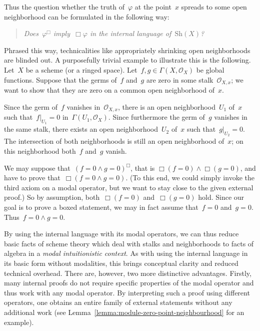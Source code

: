 \documentclass[10pt,reqno,a4paper]{amsbook}
\makeatletter
\theoremstyle{definition}
\theoremstyle{plain}
\theoremstyle{remark}
\renewcommand{\O}{\mathcal{O}}
\newcommand{\Sh}{\mathrm{Sh}}
\newcommand{\?}{\,{:}\,}
\renewcommand{\_}{\mathpunct{.}\,}
\renewenvironment{proof}[1][\proofname]{\par
  \pushQED{\qed}%
  \normalfont \topsep6\p@\@plus6\p@\relax
  \trivlist
  \item[\hskip\labelsep
        \itshape
    #1\@addpunct{.}]\ignorespaces
}{%
  \popQED\endtrivlist\@endpefalse
}
\makeatother
\begin{document}
Thus the question whether the truth of~$\varphi$ at the point~$x$ spreads to
some open neighborhood can be formulated in the following way:
\begin{quote}
\emph{Does~$\varphi^\Box$ imply~$\Box\varphi$ in the internal language
of~$\Sh(X)$?}
\end{quote}
Phrased this way, technicalities like appropriately shrinking open
neighborhoods are blinded out. A purposefully trivial example to illustrate
this is the following. Let~$X$ be a scheme (or a ringed space). Let~$f,g \in
\Gamma(X,\O_X)$ be global functions. Suppose that the germs of~$f$ and~$g$ are
zero in some stalk~$\O_{X,x}$; we want to show that they are zero on a common
open neighborhood of~$x$.

\begin{proof}[Usual proof]Since the germ of~$f$ vanishes in~$\O_{X,x}$, there
is an open neighborhood~$U_1$ of~$x$ such that~$f|_{U_1} = 0$
in~$\Gamma(U_1,\O_X)$. Since furthermore the germ of~$g$ vanishes in the same stalk,
there exists an open neighborhood~$U_2$ of~$x$ such that~$g|_{U_2} = 0$. The
intersection of both neighborhoods is still an open neighborhood of~$x$; on
this neighborhood both~$f$ and~$g$ vanish.
\end{proof}

\begin{proof}[Proof in the internal language]We may suppose that~$(f = 0 \wedge
g = 0)^\Box$, that is $\Box(f=0) \wedge \Box(g=0)$, and have to prove
that~$\Box(f=0 \wedge g=0)$. (To this end, we could simply invoke the third
axiom on a modal operator, but we want to stay close to the given external
proof.) So by assumption, both~$\Box(f=0)$ and~$\Box(g=0)$ hold. Since our goal
is to prove a boxed statement, we may in fact assume that~$f = 0$ and~$g = 0$.
Thus~$f = 0 \wedge g = 0$.\end{proof}

By using the internal language with its modal operators, we can thus reduce
basic facts of scheme theory which deal with stalks and neighborhoods to facts
of algebra in a \emph{modal intuitionistic context}. As with using the internal
language in its basic form without modalities, this brings conceptual clarity
and reduced technical overhead. There are, however, two more distinctive
advantages. Firstly, many internal proofs do not require specific properties of
the modal operator and thus work with any modal operator. By interpreting such
a proof using different operators, one obtains an entire family of external
statements without any additional work (see
Lemma~\ref{lemma:module-zero-point-neighbourhood} for an example).
\end{document}
